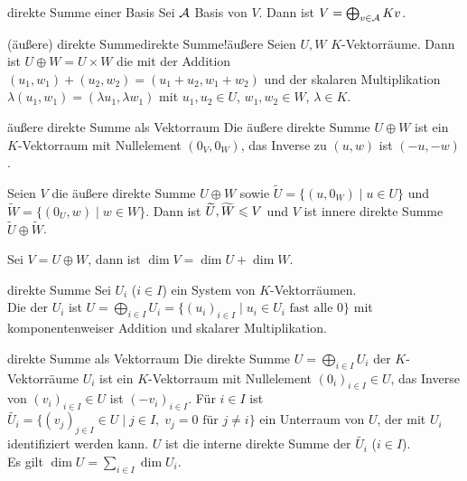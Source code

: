 \begin{Satz}{direkte Summe einer Basis}
    Sei $\mathcal{A}$ Basis von $V$.
    Dann ist $V = \bigoplus_{v \in \mathcal{A}} Kv$.
\end{Satz}

\begin{xDef}{(äußere) direkte Summe}{direkte Summe!äußere}
    Seien $U, W$ $K$-Vektorräume.
    Dann ist $U \oplus W = U \times W$ die
    mit der Addition $(u_1, w_1) + (u_2, w_2) = (u_1 + u_2, w_1 + w_2)$ und
    der skalaren Multiplikation
    $\lambda (u_1, w_1) = (\lambda u_1, \lambda w_1)$
    mit $u_1, u_2 \in U$, $w_1, w_2 \in W$, $\lambda \in K$.
\end{xDef}

\begin{Satz}{äußere direkte Summe als Vektorraum}
    Die äußere direkte Summe $U \oplus W$ ist ein $K$-Vektorraum mit
    Nullelement $(0_V, 0_W)$, das Inverse zu $(u, w)$ ist $(-u, -w)$.
\end{Satz}

\begin{Kor}
    Seien $V$ die äußere direkte Summe $U \oplus W$ sowie
    $\widetilde{U} = \{(u, 0_W) \;|\; u \in U\}$ und \\
    $\widetilde{W} = \{(0_U, w) \;|\; w \in W\}$.
    Dann ist $\widetilde{U}, \widetilde{W} \leqslant V$ und $V$ ist innere direkte
    Summe $\widetilde{U} \oplus \widetilde{W}$.
\end{Kor}

\begin{Kor}
    Sei $V = U \oplus W$, dann ist $\dim V = \dim U + \dim W$.
\end{Kor}

\begin{Def}{direkte Summe}
    Sei $U_i$ ($i \in I$) ein System
    von $K$-Vektorräumen. \\
    Die  der $U_i$ ist
    $U = \bigoplus_{i \in I} U_i =
    \{(u_i)_{i \in I} \;|\; u_i \in U_i \text{ fast alle } 0\}$ mit
    komponentenweiser Addition und skalarer Multiplikation.
\end{Def}

\begin{Satz}{direkte Summe als Vektorraum}
    Die direkte Summe $U = \bigoplus_{i \in I} U_i$
    der $K$-Vektorräume $U_i$ ist ein $K$-Vektorraum
    mit Nullelement $(0_i)_{i \in I} \in U$, das Inverse von
    $(v_i)_{i \in I} \in U$ ist $(-v_i)_{i \in I}$.
    Für $i \in I$ ist
    $\widetilde{U_i} =
    \{(v_j)_{j \in I} \in U \;|\; j \in I,\; v_j = 0 \text{ für } j \not= i\}$
    ein Unterraum von $U$, der mit $U_i$ identifiziert werden kann.
    $U$ ist die interne direkte Summe der $\widetilde{U_i}$ ($i \in I$). \\
    Es gilt $\dim U = \sum_{i \in I} \dim U_i$.
\end{Satz}

